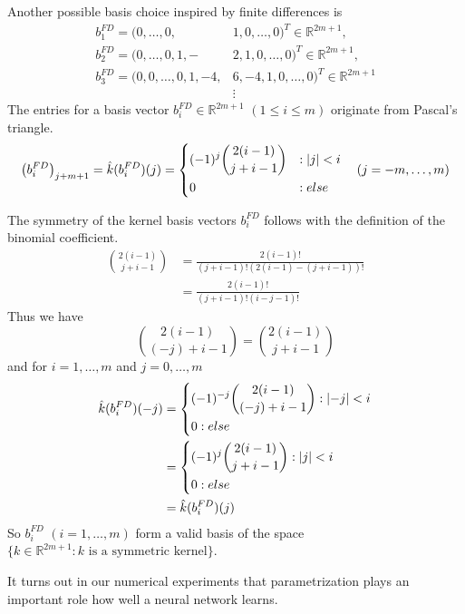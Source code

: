 \documentclass[twoside,a4paper]{article}
\begin{document}
Another possible basis choice inspired by finite differences is
\begin{align*}
	b_1^{FD} = (0, \dots, 0,& 1,0, \dots, 0)^T \in \mathbb{R}^{2m+1},\\
	b_2^{FD} = (0, \dots, 0, 1,-&2,1, 0, \dots, 0)^T \in \mathbb{R}^{2m+1},\\
	b_3^{FD} = (0, 0, \dots, 0, 1,-4,& 6,-4,1, 0, \dots, 0)^T \in \mathbb{R}^{2m+1} \\
	&\vdots
\end{align*}
The entries for a basis vector $b_i^{FD} \in \mathbb{R}^{2m+1}$ $(1 \leq i \leq m)$ 
originate from Pascal's triangle.
\begin{equation*}
	\left( b_i^{FD} \right)_{j+m+1} = \hat{k}(b_i^{FD})(j) = \begin{dcases}
		(-1)^j \binom{2(i-1)}{j+i-1} &: \left|{j}\right| < i \\
		0 &: else
	\end{dcases}
	\quad (j=-m, \dots, m)
\end{equation*}

The symmetry of the kernel basis vectors $b_i^{FD}$ follows with the definition of the binomial coefficient.
\begin{align*}
	\binom{2(i-1)}{j+i-1} &= \frac{2(i-1)!}{(j+i-1)!(2(i-1)-(j+i-1))!} \\
	&= \frac{2(i-1)!}{(j+i-1)!(i-j-1)!}
\end{align*}
Thus we have
\begin{equation*}
	\binom{2(i-1)}{(-j)+i-1} = \binom{2(i-1)}{j+i-1}
\end{equation*}
and for $i=1, \dots, m$ and $j= 0, \dots, m$
\begin{align*}
	\hat{k}(b_i^{FD})(-j) &= \begin{dcases}
		(-1)^{-j} \binom{2(i-1)}{(-j)+i-1} : \left|{-j}\right| < i \\
		0 : else
	\end{dcases} \\
	&= \begin{dcases}
		(-1)^{j} \binom{2(i-1)}{j+i-1} : \left|{j}\right| < i \\
		0 : else
	\end{dcases} \\
	&= \hat{k}(b_i^{FD})(j) 
\end{align*}
So $b_i^{FD}$ $(i=1, \dots, m)$ form a valid basis of
the space $\{ k \in \mathbb{R}^{2m+1} : k \text{ is a symmetric kernel} \}$.

It turns out in our numerical experiments that
parametrization plays an important role how well a neural network learns.
\end{document}
